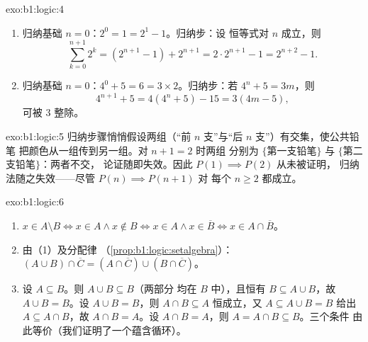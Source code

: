 \begin{solution}{exo:b1:logic:4}
\begin{enumerate}
  \item 归纳基础 $n = 0$：$2^0 = 1 = 2^1 - 1$。归纳步：设
        恒等式对 $n$ 成立，则
        \[
        \sum_{k=0}^{n+1} 2^k = (2^{n+1} - 1) + 2^{n+1}
        = 2 \cdot 2^{n+1} - 1 = 2^{n+2} - 1 .
        \]
  \item 归纳基础 $n = 0$：$4^0 + 5 = 6 = 3 \times 2$。归纳步：若
        $4^n + 5 = 3m$，则
        \[
        4^{n+1} + 5 = 4(4^n + 5) - 15 = 3(4m - 5),
        \]
        可被 $3$ 整除。
\end{enumerate}
\end{solution}

\begin{solution}{exo:b1:logic:5}
归纳步骤悄悄假设两组（“前
$n$ 支”与“后 $n$ 支”）有交集，使公共铅笔
把颜色从一组传到另一组。对 $n + 1 = 2$ 时两组
分别为 $\{$第一支铅笔$\}$ 与 $\{$第二支铅笔$\}$：两者不交，
论证随即失效。因此 $P(1) \implies P(2)$ 从未被证明，
归纳法随之失效——尽管 $P(n) \implies P(n+1)$ 对
每个 $n \geq 2$ 都成立。
\end{solution}

\begin{solution}{exo:b1:logic:6}
\begin{enumerate}
  \item $x \in A \setminus B \iff x \in A \land x \notin B \iff x \in
        A \land x \in \overline{B} \iff x \in A \cap \overline{B}$。
  \item 由（1）及分配律
        （\cref{prop:b1:logic:setalgebra}）：
        $(A \cup B) \cap \overline{C} = (A \cap \overline{C}) \cup
        (B \cap \overline{C})$。
  \item 设 $A \subseteq B$。则 $A \cup B \subseteq B$（两部分
        均在 $B$ 中），且恒有 $B \subseteq A \cup B$，故
        $A \cup B = B$。设 $A \cup B = B$，则 $A \cap B
        \subseteq A$ 恒成立，又 $A \subseteq A \cup B = B$ 给出
        $A \subseteq A \cap B$，故 $A \cap B = A$。设 $A \cap B =
        A$，则 $A = A \cap B \subseteq B$。三个条件
        由此等价（我们证明了一个蕴含循环）。
\end{enumerate}
\end{solution}

